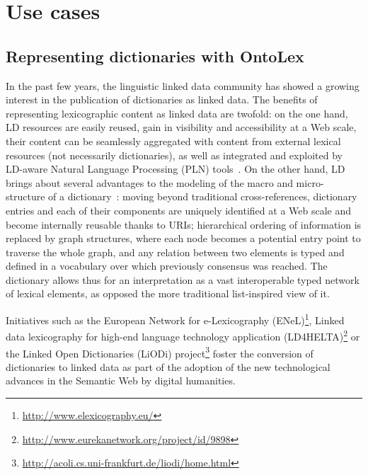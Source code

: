 \documentclass[12pt,a4paper]{elex2017}
\begin{document}
\section{Use cases}

\subsection{Representing dictionaries with OntoLex}

\label{sec:dictionaries}

In the past few years, the linguistic linked data community 
has showed a growing interest in the publication of dictionaries as linked
data. The 
benefits of representing lexicographic content as linked data are twofold: on 
the one hand, LD resources are easily reused, gain in visibility and 
accessibility at a Web scale, their content can be seamlessly aggregated with 
content from external lexical resources (not necessarily dictionaries), as well 
as integrated and exploited by LD-aware Natural Language Processing (PLN) tools~\citep{klimek2015enhancing,gracia2016apertium}. On the other hand, LD brings about several advantages to the modeling of the
 macro and micro-structure of a dictionary~\citep{bosque2016linked}: moving beyond traditional 
 cross-references, dictionary entries and each of their components are uniquely 
 identified at a Web scale and become internally reusable thanks to URIs; 
 hierarchical ordering of information is replaced by graph structures, where 
 each node becomes a potential entry point to traverse the whole graph, and any 
 relation between two elements is typed and defined in a vocabulary over which 
 previously consensus was reached. The dictionary allows thus for an interpretation as a vast interoperable typed network of lexical elements, as opposed the more traditional list-inspired view of it. 

Initiatives such as the European Network for e-Lexicography (ENeL)\footnote{\url{http://www.elexicography.eu/}}, Linked data lexicography for 
high-end language technology application (LD4HELTA)\footnote{\url{http://www.eurekanetwork.org/project/id/9898}} or the Linked Open
 Dictionaries (LiODi) project\footnote{\url{http://acoli.cs.uni-frankfurt.de/liodi/home.html}} foster the 
 conversion of dictionaries to linked data as part of the adoption of the new 
 technological advances in the Semantic Web by digital humanities. 
\end{document}
